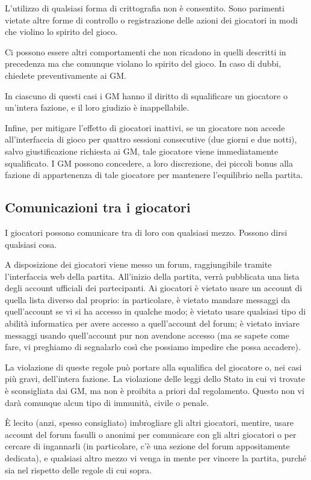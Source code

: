 \documentclass[a4paper,10pt]{article}
\begin{document}
L'utilizzo di qualsiasi forma di crittografia non è consentito. Sono parimenti vietate altre forme di controllo o registrazione delle azioni dei giocatori in modi che violino lo spirito del gioco.

Ci possono essere altri comportamenti che non ricadono in quelli descritti in precedenza ma che comunque violano lo spirito del gioco. In caso di dubbi, chiedete preventivamente ai GM.

In ciascuno di questi casi i GM hanno il diritto di squalificare un giocatore o un'intera fazione, e il loro giudizio è inappellabile.

Infine, per mitigare l'effetto di giocatori inattivi, se un giocatore non accede all'interfaccia di gioco per quattro sessioni consecutive (due giorni e due notti), salvo giustificazione richiesta ai GM, tale giocatore viene immediatamente squalificato. I GM possono concedere, a loro discrezione, dei piccoli bonus alla fazione di appartenenza di tale giocatore per mantenere l'equilibrio nella partita.

\subsection{Comunicazioni tra i giocatori}

I giocatori possono comunicare tra di loro con qualsiasi mezzo. Possono dirsi qualsiasi cosa.

A disposizione dei giocatori viene messo un forum, raggiungibile tramite l'interfaccia web della partita.  All'inizio della partita, verrà pubblicata una lista degli account ufficiali dei partecipanti. Ai giocatori è vietato usare un account di quella lista diverso dal proprio: in particolare, è vietato mandare messaggi da quell'account se vi si ha accesso in qualche modo; è vietato usare qualsiasi tipo di abilità informatica per avere accesso a quell'account del forum; è vietato inviare messaggi usando quell'account pur non avendone accesso (ma se sapete come fare, vi preghiamo di segnalarlo così che possiamo impedire che possa accadere).

La violazione di queste regole può portare alla squalifica del giocatore o, nei casi più gravi, dell'intera fazione. La violazione delle leggi dello Stato in cui vi trovate è sconsigliata dai GM, ma non è proibita a priori dal regolamento. Questo non vi darà comunque alcun tipo di immunità, civile o penale.

È lecito (anzi, spesso consigliato) imbrogliare gli altri giocatori, mentire, usare account del forum fasulli o anonimi per comunicare con gli altri giocatori o per cercare di ingannarli (in particolare, c'è una sezione del forum appositamente dedicata), e qualsiasi altro mezzo vi venga in mente per vincere la partita, purché sia nel rispetto delle regole di cui sopra.
\end{document}
